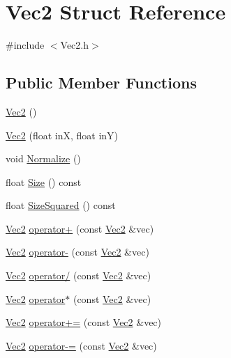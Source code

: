 \hypertarget{struct_vec2}{}\section{Vec2 Struct Reference}
\label{struct_vec2}


{\ttfamily \#include $<$Vec2.\+h$>$}

\subsection*{Public Member Functions}
\begin{DoxyCompactItemize}
\item 
\mbox{\hyperlink{struct_vec2_a76080feed7005893ecc634f903cfbae0}{Vec2}} ()
\item 
\mbox{\hyperlink{struct_vec2_a2c1181bd206d6544bf8487cf688a7096}{Vec2}} (float inX, float inY)
\item 
void \mbox{\hyperlink{struct_vec2_a0ccdf7c1f30b7e2e368860ed8530a296}{Normalize}} ()
\item 
float \mbox{\hyperlink{struct_vec2_a2d243a47e5ee4e168c71f3e013900ea8}{Size}} () const
\item 
float \mbox{\hyperlink{struct_vec2_ae3f8d3905cd5f737fa91a8dcfa250fe9}{Size\+Squared}} () const
\item 
\mbox{\hyperlink{struct_vec2}{Vec2}} \mbox{\hyperlink{struct_vec2_a65905f53c16179cea854fda5336736e2}{operator+}} (const \mbox{\hyperlink{struct_vec2}{Vec2}} \&vec)
\item 
\mbox{\hyperlink{struct_vec2}{Vec2}} \mbox{\hyperlink{struct_vec2_ab41b66fe339aae8150829626682c355e}{operator-\/}} (const \mbox{\hyperlink{struct_vec2}{Vec2}} \&vec)
\item 
\mbox{\hyperlink{struct_vec2}{Vec2}} \mbox{\hyperlink{struct_vec2_a702c5b3a06645680a94cd1929eaddca8}{operator/}} (const \mbox{\hyperlink{struct_vec2}{Vec2}} \&vec)
\item 
\mbox{\hyperlink{struct_vec2}{Vec2}} \mbox{\hyperlink{struct_vec2_a99d3335f38f28886070edacf65b45e5d}{operator$\ast$}} (const \mbox{\hyperlink{struct_vec2}{Vec2}} \&vec)
\item 
\mbox{\hyperlink{struct_vec2}{Vec2}} \mbox{\hyperlink{struct_vec2_afa88ae0d88c6bd092ca1592a06b1be04}{operator+=}} (const \mbox{\hyperlink{struct_vec2}{Vec2}} \&vec)
\item 
\mbox{\hyperlink{struct_vec2}{Vec2}} \mbox{\hyperlink{struct_vec2_a019231f7b97a2fb52c67487088fa2022}{operator-\/=}} (const \mbox{\hyperlink{struct_vec2}{Vec2}} \&vec)
\item 

\end{DoxyCompactItemize}
